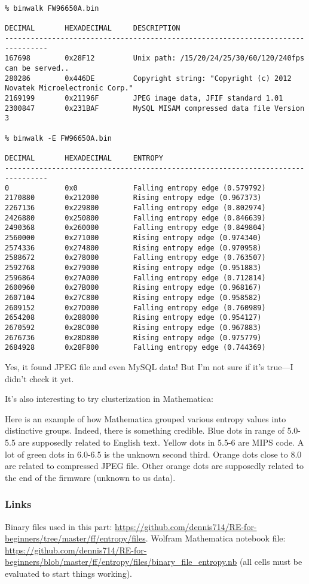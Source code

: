 \begin{lstlisting}
% binwalk FW96650A.bin 

DECIMAL       HEXADECIMAL     DESCRIPTION
--------------------------------------------------------------------------------
167698        0x28F12         Unix path: /15/20/24/25/30/60/120/240fps can be served..
280286        0x446DE         Copyright string: "Copyright (c) 2012 Novatek Microelectronic Corp."
2169199       0x21196F        JPEG image data, JFIF standard 1.01
2300847       0x231BAF        MySQL MISAM compressed data file Version 3

% binwalk -E FW96650A.bin 

DECIMAL       HEXADECIMAL     ENTROPY
--------------------------------------------------------------------------------
0             0x0             Falling entropy edge (0.579792)
2170880       0x212000        Rising entropy edge (0.967373)
2267136       0x229800        Falling entropy edge (0.802974)
2426880       0x250800        Falling entropy edge (0.846639)
2490368       0x260000        Falling entropy edge (0.849804)
2560000       0x271000        Rising entropy edge (0.974340)
2574336       0x274800        Rising entropy edge (0.970958)
2588672       0x278000        Falling entropy edge (0.763507)
2592768       0x279000        Rising entropy edge (0.951883)
2596864       0x27A000        Falling entropy edge (0.712814)
2600960       0x27B000        Rising entropy edge (0.968167)
2607104       0x27C800        Rising entropy edge (0.958582)
2609152       0x27D000        Falling entropy edge (0.760989)
2654208       0x288000        Rising entropy edge (0.954127)
2670592       0x28C000        Rising entropy edge (0.967883)
2676736       0x28D800        Rising entropy edge (0.975779)
2684928       0x28F800        Falling entropy edge (0.744369)
\end{lstlisting}

Yes, it found JPEG file and even MySQL data!
But I'm not sure if it's true---I didn't check it yet.

It's also interesting to try clusterization in Mathematica:



Here is an example of how Mathematica grouped various entropy values into distinctive groups.
Indeed, there is something credible. Blue dots in range of 5.0-5.5 are supposedly related to English text.
Yellow dots in 5.5-6 are MIPS code. A lot of green dots in 6.0-6.5 is the unknown second third.
Orange dots close to 8.0 are related to compressed JPEG file.
Other orange dots are supposedly related to the end of the firmware (unknown to us data).

\subsubsection{Links}

Binary files used in this part: \url{https://github.com/dennis714/RE-for-beginners/tree/master/ff/entropy/files}.
Wolfram Mathematica notebook file: \url{https://github.com/dennis714/RE-for-beginners/blob/master/ff/entropy/files/binary_file_entropy.nb}
(all cells must be evaluated to start things working).

